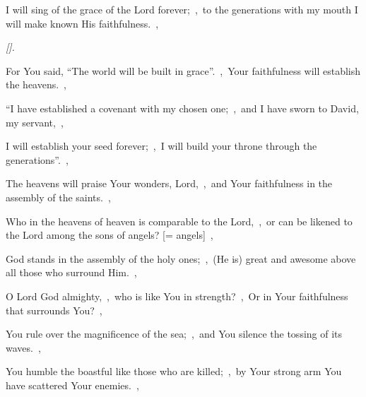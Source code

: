 \documentclass[12pt,twoside,a5paper]{article}
\begin{document}





\begin{normalparskip}
  I will sing of the grace of the Lord forever;~\sep\ to the generations with my mouth I will make known His faithfulness.~\sep


  \emph{[].}

  For You said, ``The world will be built in grace''.~\sep\ Your faithfulness will establish the heavens.~\sep

  ``I have established a covenant with my chosen one;~\sep\ and I have sworn to David, my servant,~\sep

  I will establish your seed forever;~\sep\ I will build your throne through the generations''.~\sep

  The heavens will praise Your wonders, Lord,~\sep\ and Your faithfulness in the assembly of the saints.~\sep

  Who in the heavens of heaven is comparable to the Lord,~\sep\ or can be likened to the Lord among the sons of angels? [= angels]~\sep

  God stands in the assembly of the holy ones;~\sep\ (He is) great and awesome above all those who surround Him.~\sep

  O Lord God almighty,~\sep\ who is like You in strength?~\sep\ Or in Your faithfulness that surrounds You?~\sep

  You rule over the magnificence of the sea;~\sep\ and You silence the tossing of its waves.~\sep

  You humble the boastful like those who are killed;~\sep\ by Your strong arm You have scattered Your enemies.~\sep


\end{normalparskip}
\end{document}

